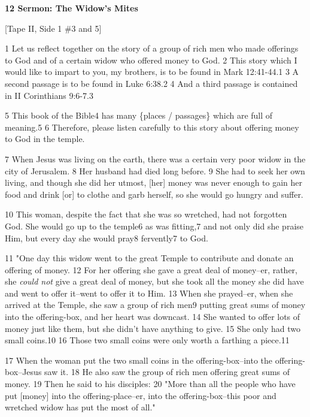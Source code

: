 
\textbf{12 Sermon: The Widow's Mites}

[Tape II, Side 1 \#3 and 5]

1 Let us reflect together on the story of a group of rich men who made offerings
to God and of a certain widow who offered money to God. 2 This story which I would
like to impart to you, my brothers, is to be found in Mark 12:41-44.1 3 A second
passage is to be found in Luke 6:38.2 4 And a third passage is contained in II
Corinthians 9:6-7.3

5 This book of the Bible4 has many \{places / passages\} which are full of meaning.5
6 Therefore, please listen carefully to this story about offering money to God
in the temple.

7 When Jesus was living on the earth, there was a certain very poor widow in the
city of Jerusalem. 8 Her husband had died long before. 9 She had to seek her own
living, and though she did her utmost, [her] money was never enough to gain her
food and drink [or] to clothe and garb herself, so she would go hungry and suffer.

10 This woman, despite the fact that she was so wretched, had not forgotten God.
She would go up to the temple6 as was fitting,7 and not only did she praise Him,
but every day she would pray8 fervently7 to God.

11 "One day this widow went to the great Temple to contribute and donate
an offering of money. 12 For her offering she gave a great deal of money--er, rather,
she \textit{could not} give a great deal of money, but she took all the money she
did have and went to offer it--went to offer it to Him. 13 When she prayed--er,
when she arrived at the Temple, she saw a group of rich men9 putting great sums
of money into the offering-box, and her heart was downcast. 14 She wanted to offer
lots of money just like them, but she didn't have anything to give. 15 She only
had two small coins.10 16 Those two small coins were only worth a farthing a piece.11

17 When the woman put the two small coins in the offering-box--into the offering-box--Jesus
saw it. 18 He also saw the group of rich men offering great sums of money. 19 Then
he said to his disciples: 20 "More than all the people who have put [money]
into the offering-place--er, into the offering-box--this poor and wretched widow
has put the most of all."

